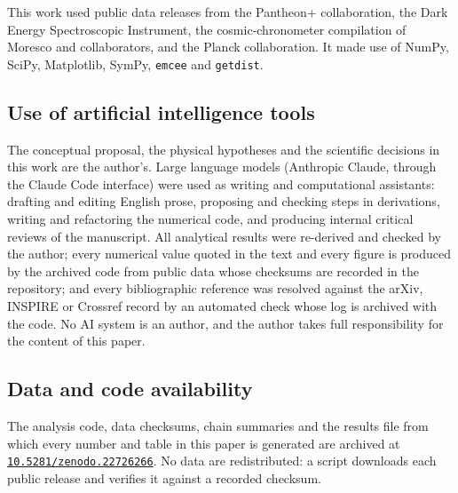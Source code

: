 This work used public data releases from the Pantheon+ collaboration, the Dark
Energy Spectroscopic Instrument, the cosmic-chronometer compilation of Moresco
and collaborators, and the Planck collaboration. It made use of NumPy, SciPy,
Matplotlib, SymPy, \texttt{emcee} and \texttt{getdist}.

\subsection*{Use of artificial intelligence tools}

The conceptual proposal, the physical hypotheses and the scientific decisions
in this work are the author's. Large language models (Anthropic Claude, through
the Claude Code interface) were used as writing and computational assistants:
drafting and editing English prose, proposing and checking steps in
derivations, writing and refactoring the numerical code, and producing internal
critical reviews of the manuscript. All analytical results were re-derived and
checked by the author; every numerical value quoted in the text and every
figure is produced by the archived code from public data whose checksums are
recorded in the repository; and every bibliographic reference was resolved
against the arXiv, INSPIRE or Crossref record by an automated check whose log
is archived with the code. No AI system is an author, and the author takes full
responsibility for the content of this paper.

\subsection*{Data and code availability}

The analysis code, data checksums, chain summaries and the results file from
which every number and table in this paper is generated are archived at
\href{https://doi.org/10.5281/zenodo.22726266}{\texttt{10.5281/zenodo.22726266}}. No data are redistributed: a script downloads each public
release and verifies it against a recorded checksum.
